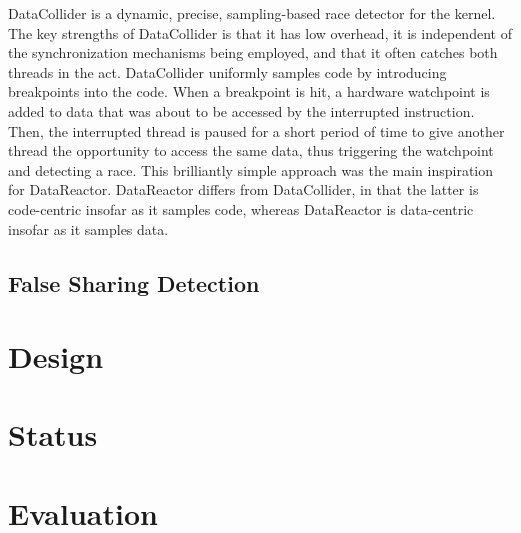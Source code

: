 \documentclass{sig-alternate}
\newcommand{\Toolname}{DataReactor}
\begin{document}
DataCollider \cite{DataCollider} is a dynamic, precise, sampling-based race detector for the kernel. The key strengths of
DataCollider is that it has low overhead, it is independent of the synchronization mechanisms being employed, and that
it often catches both threads in the act. DataCollider uniformly samples code by introducing breakpoints into the code.
When a breakpoint is hit, a hardware watchpoint is added to data that was about to be accessed by the interrupted instruction.
Then, the interrupted thread is paused for a short period of time to give another thread the opportunity to access the
same data, thus triggering the watchpoint and detecting a race. This brilliantly simple approach was the main inspiration
for \Toolname{}. \Toolname{} differs from DataCollider, in that the latter is code-centric insofar as it samples code, whereas
\Toolname{} is data-centric insofar as it samples data.

\subsection{False Sharing Detection}


\section{Design}\label{sec:design}


\section{Status}\label{sec:status}

\section{Evaluation}\label{sec:evaluation}



\end{document}
